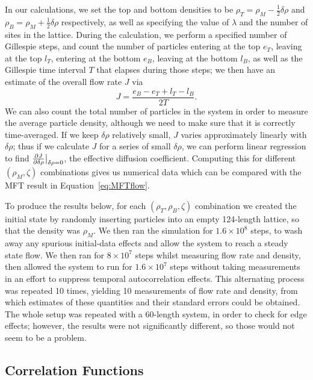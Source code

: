 In our calculations, we set the top and bottom densities to be $\rho_T = \rho_M - \frac{1}{2} \delta\rho$ and $\rho_B = \rho_M + \frac{1}{2} \delta\rho$ respectively, as well as specifying the value of $\lambda$ and the number of sites
in the lattice. During the calculation, we perform a specified number
of Gillespie steps, and count the number of particles entering at the top $e_T$, leaving at the top $l_T$, entering at the bottom $e_B$, leaving at the bottom $l_B$, as well as the Gillespie time interval $T$ that elapses during
those steps; we then have an estimate of the overall flow rate $J$ via
\begin{equation}
 J = \frac{e_B-e_T+l_T-l_B}{2T}.
\end{equation}
We can also count the total number of particles in the system in order to measure the average particle density, although we need to make sure that it is correctly time-averaged.
If we keep $\delta\rho$ relatively small, $J$ varies approximately linearly with $\delta\rho$; thus if we calculate $J$ for a series of small $\delta \rho$, we can perform linear regression to find $\frac{\partial J}{\partial \delta\rho}\big|_{\delta\rho=0}$,
the effective diffusion coefficient. Computing this for different $(\rho_M, \zeta)$ combinations gives us numerical data which can be compared with the MFT result in Equation~\ref{eq:MFTflow}.

To produce the results below, for each $(\rho_T, \rho_B, \zeta)$ combination we created the initial state by randomly inserting particles into an empty 124-length lattice, so that the density was $\rho_M$. We then ran the simulation for
$1.6\times10^8$ steps, to wash away any spurious initial-data effects and allow the system to reach a steady state flow. We then ran for $8\times10^7$ steps whilst measuring flow rate and density, then allowed the system to run for $1.6\times10^7$
steps without taking measurements in an effort to suppress temporal autocorrelation effects. This alternating process was repeated 10 times, yielding 10 measurements of flow rate and density, from which estimates of these quantities and their
standard errors could be obtained. The whole setup was repeated with a 60-length system, in order to check for edge effects; however, the results were not significantly different, so those would not seem to be a problem.

\subsection{Correlation Functions}